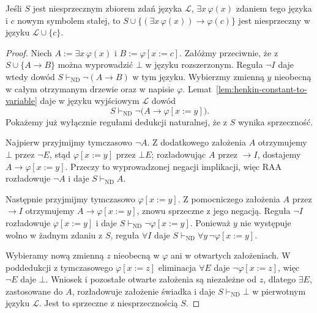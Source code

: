 \begin{lemat}\label{lem:henkin-one-witness}
Jeśli $S$ jest niesprzecznym zbiorem zdań języka $\mathcal L$, $\exists x\,\varphi(x)$ zdaniem tego języka i $c$ nowym symbolem stałej, to $S\cup\{(\exists x\,\varphi(x))\to\varphi(c)\}$ jest niesprzeczny w języku $\mathcal L\cup\{c\}$.
\end{lemat}
\begin{proof}
Niech $A:=\exists x\,\varphi(x)$ i $B:=\varphi[x:=c]$. Załóżmy przeciwnie, że z $S\cup\{A\to B\}$ można wyprowadzić $\bot$ w języku rozszerzonym. Reguła $\neg I$ daje wtedy dowód $S\vdash_{\mathrm{ND}}\neg(A\to B)$ w tym języku. Wybierzmy zmienną $y$ nieobecną w całym otrzymanym drzewie oraz w napisie $\varphi$. Lemat~\ref{lem:henkin-constant-to-variable} daje w języku wyjściowym $\mathcal L$ dowód
\[
S\vdash_{\mathrm{ND}}\neg\bigl(A\to\varphi[x:=y]\bigr).
\]
Pokażemy już wyłącznie regułami dedukcji naturalnej, że z $S$ wynika sprzeczność.

Najpierw przyjmijmy tymczasowo $\neg A$. Z dodatkowego założenia $A$ otrzymujemy $\bot$ przez $\neg E$, stąd $\varphi[x:=y]$ przez $\bot E$; rozładowując $A$ przez $\to I$, dostajemy $A\to\varphi[x:=y]$. Przeczy to wyprowadzonej negacji implikacji, więc $\mathrm{RAA}$ rozładowuje $\neg A$ i daje $S\vdash_{\mathrm{ND}}A$.

Następnie przyjmijmy tymczasowo $\varphi[x:=y]$. Z pomocniczego założenia $A$ przez $\to I$ otrzymujemy $A\to\varphi[x:=y]$, znowu sprzeczne z jego negacją. Reguła $\neg I$ rozładowuje $\varphi[x:=y]$ i daje $S\vdash_{\mathrm{ND}}\neg\varphi[x:=y]$. Ponieważ $y$ nie występuje wolno w żadnym zdaniu z $S$, reguła $\forall I$ daje $S\vdash_{\mathrm{ND}}\forall y\,\neg\varphi[x:=y]$.

Wybieramy nową zmienną $z$ nieobecną w $\varphi$ ani w otwartych założeniach. W poddedukcji z tymczasowego $\varphi[x:=z]$ eliminacja $\forall E$ daje $\neg\varphi[x:=z]$, więc $\neg E$ daje $\bot$. Wniosek i pozostałe otwarte założenia są niezależne od $z$, dlatego $\exists E$, zastosowane do $A$, rozładowuje założenie świadka i daje $S\vdash_{\mathrm{ND}}\bot$ w pierwotnym języku $\mathcal L$. Jest to sprzeczne z niesprzecznością $S$.
\end{proof}

